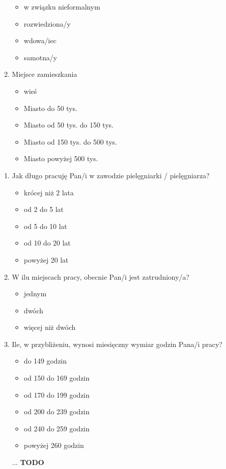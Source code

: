 \documentclass[a4paper,12pt,twoside,openright]{mwrep}
\newcommand{\TODO}{\textbf{TODO}}
\begin{document}
\begin{enumerate}[label=(\roman*)]
\begin{itemize}
			\item{w związku nieformalnym}
			\item{rozwiedziona/y}
			\item{wdowa/iec}
			\item{samotna/y}
		\end{itemize}
	\item{Miejsce zamieszkania}
		\begin{itemize}
			\item{wieś}
			\item{Miasto do 50 tys.}
			\item{Miasto od 50 tys. do 150 tys.}
			\item{Miasto od 150 tys. do 500 tys.}
			\item{Miasto powyżej 500 tys.}
		\end{itemize}

\end{enumerate}

\begin{enumerate}[label=\arabic*)]
		\item{Jak długo pracuję  Pan/i w zawodzie pielęgniarki / pielęgniarza?}
		\begin{itemize}
			\item{krócej niż 2 lata}
			\item{od 2 do 5 lat}
			\item{od 5 do 10 lat}
			\item{od 10 do 20 lat}
			\item{powyżej 20 lat}
		\end{itemize}
		
		\item{W ilu miejscach pracy, obecnie Pan/i jest zatrudniony/a?}
		\begin{itemize}
			\item{jednym}
			\item{dwóch}
			\item{więcej niż dwóch}
		\end{itemize}
		
		\item{Ile, w przybliżeniu, wynosi miesięczny wymiar godzin Pana/i pracy?}
		\begin{itemize}
			\item{do 149 godzin}
			\item{od 150 do 169 godzin}
			\item{od 170 do 199 godzin}
			\item{od 200 do 239 godzin}
			\item{od 240 do 259 godzin}
			\item{powyżej 260 godzin}
		\end{itemize}
		
		...
		\TODO
\end{enumerate}


\end{document}
